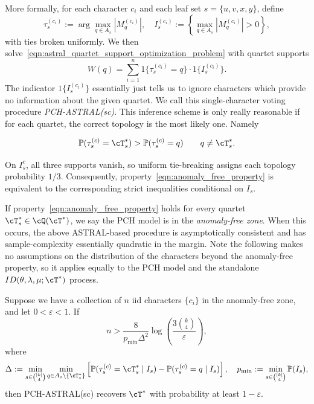 More formally, for each character $c_i$ and each leaf set
$s=\{u,v,x,y\}$, define
\[
    \tau_s^{(c_i)}
    :=
    \arg\max_{q\in A_s} |M_q^{(c_i)}|, \quad I^{(c_i)}_s := \left\{\max_{q\in A_s} |M_q^{(c_i)}| > 0\right\},
\]
\noindent with ties broken uniformly. We then solve~\eqref{eqn:astral_quartet_support_optimization_problem} with
quartet supports
%
    \[W(q) = \sum_{i=1}^n 1\{\tau_s^{(c_i)} = q\} \cdot 1\{I_s^{(c_i)}\}.\]
%
The indicator $1\{I_s^{(c_i)}\}$ essentially just tells us to ignore characters which provide no information
about the given quartet. We call this single-character voting procedure \textit{PCH-ASTRAL(sc)}.
This inference scheme is only really reasonable if for
each quartet, the correct topology is the most likely one. Namely

\begin{equation}
    \P(\tau_s^{(c)} = \cT_s^*) > \P(\tau_s^{(c)} = q) \qquad q \neq \cT_s^*.
    \label{eqn:anomaly_free_property}
\end{equation}

\noindent On $I_s^c$, all three supports vanish, so uniform tie-breaking assigns each
topology probability $1/3$. Consequently, property~\eqref{eqn:anomaly_free_property}
is equivalent to the corresponding strict inequalities conditional on $I_s$.

If property~\eqref{eqn:anomaly_free_property} holds for every quartet $\cT_s^* \in \cQ(\cT^*)$,
we say the PCH model is in the \textit{anomaly-free zone}. When this occurs, the above
ASTRAL-based procedure is asymptotically consistent and has sample-complexity essentially 
quadratic in the margin. Note the following makes no assumptions on the distribution of the characters
beyond the anomaly-free property, so it applies equally to the PCH model and the standalone $ID(\theta, \lambda, \mu; \cT^*)$ process.

\begin{theorem}
\label{thm:sample_complexity_separate_characters}
    Suppose we have a collection of $n$ iid characters $\{c_i\}$ in the anomaly-free zone, and let $0<\varepsilon<1$. If
        \[n > \frac{8}{p_{\min}\Delta^2} \log\left(\frac{3\binom{k}{4}}{\varepsilon}\right),\]
        \noindent where
        \[\Delta := \min_{s \in {[k] \choose 4}} \min_{q \in A_s\setminus\{\cT_s^*\}} \left[\P(\tau_s^{(c)} = \cT_s^* \mid I_s) - \P(\tau_s^{(c)} = q \mid I_s) \right], \quad p_{\min} := \min_{s \in {[k] \choose 4}} \P(I_s),\]
    \noindent then PCH-ASTRAL(sc) recovers $\cT^*$ with probability at least $1-\varepsilon$.
\end{theorem}

